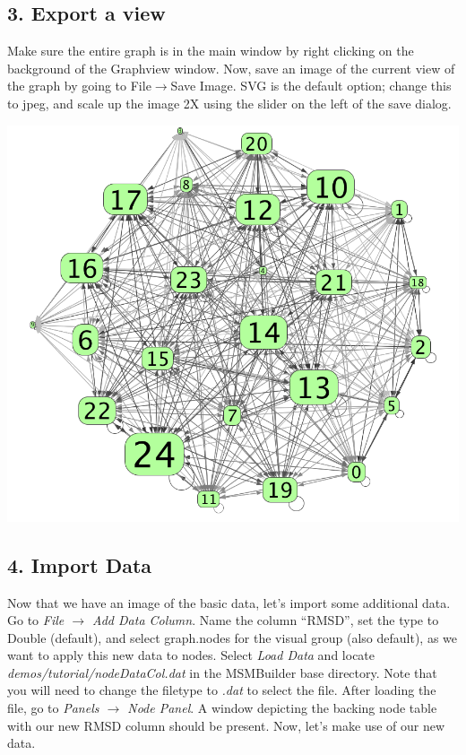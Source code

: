 \documentclass[10pt,a4paper]{report}
\begin{document}
\subsection*{3. Export a view}
Make sure the entire graph is in the main window by right clicking on the background of the Graphview window. Now, save an image of the current view of the graph by going to File$\rightarrow$Save Image. SVG is the default option; change this to jpeg, and scale up the image 2X using the slider on the left of the save dialog. 

\begin{center}
\includegraphics[scale=.3]{basic.png}
\end{center}

\subsection*{4. Import Data}
Now that we have an image of the basic data, let's import some additional data. Go to \emph{File $\rightarrow$ Add Data Column}. Name the column ``RMSD'', set the type to Double (default), and select graph.nodes for the visual group (also default), as we want to apply this new data to nodes. Select \emph{Load Data} and locate \emph{demos/tutorial/nodeDataCol.dat} in the MSMBuilder base directory. Note that you will need to change the filetype to \emph{.dat} to select the file. 
After loading the file, go to \emph{Panels $\rightarrow$ Node Panel}. A window depicting the backing node table with our new RMSD column should be present. 
Now, let's make use of our new data.
\end{document}
